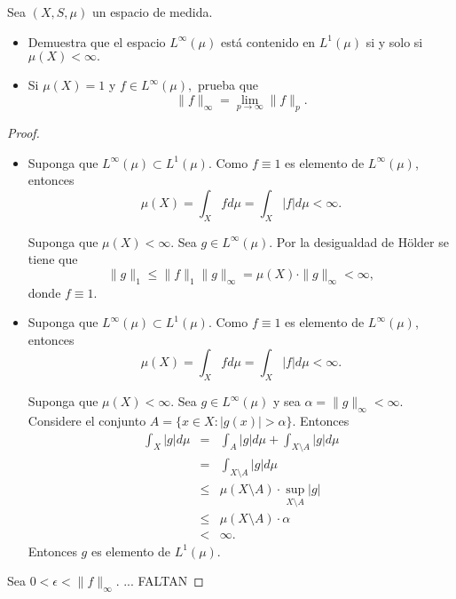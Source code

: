 \documentclass[12pt]{article}
\newenvironment{problem}[2][Problema]{\begin{trivlist}
\item[\hskip \labelsep {\bfseries #1}\hskip \labelsep {\bfseries #2.}]}{\end{trivlist}}
\begin{document}
\begin{problem}{24} Sea $(X, S, \mu)$ un espacio de medida.
\begin{itemize}
\item[a)] Demuestra que el espacio $L^\infty(\mu)$ está contenido en $L^1(\mu)$ si y solo si $\mu(X) < \infty.$
\item[b)] Si $\mu(X) = 1$ y $f \in L^\infty(\mu),$ prueba que
$$\| f \|_\infty = \lim_{p \to \infty} \| f \|_p.$$
\end{itemize}
\end{problem}
\begin{proof} \textbf{ }
\begin{itemize}
\item[a.1)] Suponga que $L^\infty(\mu) \subset L^1(\mu)$. Como $f \equiv 1$ es elemento de $L^\infty(\mu)$, entonces
$$\mu(X) = \int_X f d \mu = \int_X \lvert f \rvert  d \mu < \infty.$$

Suponga que $\mu(X) < \infty.$  Sea $g \in L^\infty(\mu)$. Por la desigualdad de Hölder se tiene que
$$\|g \|_1 \leq \| f \|_1 \| g \|_\infty = \mu(X) \cdot \| g \|_\infty < \infty,$$
donde $f \equiv 1.$

\item[a.2)] Suponga que $L^\infty(\mu) \subset L^1(\mu)$. Como $f \equiv 1$ es elemento de $L^\infty(\mu)$, entonces
$$\mu(X) = \int_X f d \mu = \int_X \lvert f \rvert  d \mu < \infty.$$


Suponga que $\mu(X) < \infty.$ Sea $g \in L^\infty(\mu)$ y sea $\alpha = \| g \|_\infty < \infty$. Considere el conjunto $A = \{x \in X: \lvert g(x) \rvert > \alpha\}$. Entonces
\begin{eqnarray*}
    \int_X \lvert g \rvert d \mu &=& \int_A \lvert g \rvert d \mu + \int_{X\setminus A} \lvert g \rvert d \mu\\
    &=& \int_{X\setminus A} \lvert g \rvert d \mu\\
    &\leq& \mu(X\setminus A) \cdot \sup_{X \setminus A} \lvert g \rvert \\
    &\leq& \mu(X\setminus A) \cdot \alpha \\
    & < & \infty.
\end{eqnarray*}
Entonces $g$ es elemento de $L^1(\mu).$
\end{itemize}

\item[b)] Sea $0 < \epsilon < \| f \|_\infty$. ... FALTAN
    
\end{proof}
\end{document}
